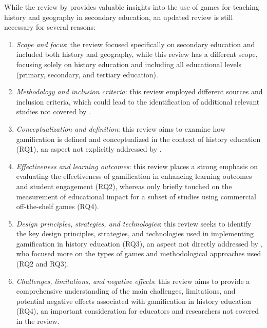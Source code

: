 \documentclass[a4paper,fleqn]{cas-sc}
\begin{document}
While the review by \citet{Oceja2022419} provides valuable insights into the use of games for teaching history and geography in secondary education, an updated review is still necessary for several reasons:
\begin{enumerate}[noitemsep]
 \item 
\textit{Scope and focus}: the \citet{Oceja2022419} review focused specifically on secondary education and included both history and geography, while this review has a different scope, focusing solely on history education and including all educational levels (primary, secondary, and tertiary education).

 \item 
\textit{Methodology and inclusion criteria}: this review employed different sources and inclusion criteria, which could lead to the identification of additional relevant studies not covered by \citet{Oceja2022419}.

 \item 
\textit{Conceptualization and definition}: this review aims to examine how gamification is defined and conceptualized in the context of history education (RQ1), an aspect not explicitly addressed by \citet{Oceja2022419}.

 \item 
\textit{Effectiveness and learning outcomes}: this review places a strong emphasis on evaluating the effectiveness of gamification in enhancing learning outcomes and student engagement (RQ2), whereas \citet{Oceja2022419} only briefly touched on the measurement of educational impact for a subset of studies using commercial off-the-shelf games (RQ4).

 \item 
\textit{Design principles, strategies, and technologies}: this review seeks to identify the key design principles, strategies, and technologies used in implementing gamification in history education (RQ3), an aspect not directly addressed by \citet{Oceja2022419}, who focused more on the types of games and methodological approaches used (RQ2 and RQ3).

 \item 
\textit{Challenges, limitations, and negative effects}: this review aims to provide a comprehensive understanding of the main challenges, limitations, and potential negative effects associated with gamification in history education (RQ4), an important consideration for educators and researchers not covered in the \citet{Oceja2022419} review.

\end{enumerate}
\end{document}

